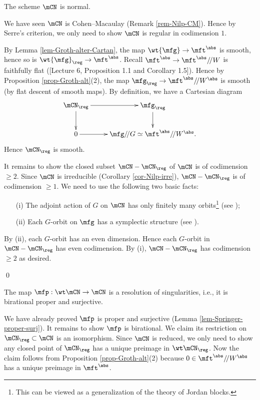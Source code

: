 	
	\begin{prop}
		The scheme $\mCN$ is normal.
	\end{prop}

	\proof[Sketch]
		We have seen $\mCN$ is Cohen--Macaulay (Remark \ref{rem-Nilp-CM}). Hence by Serre's criterion, we only need to show $\mCN$ is regular in codimension $1$. 

		By Lemma \ref{lem-Groth-alter-Cartan}, the map $\wt{\mfg} \to \mft^\abs$ is smooth, hence so is $\wt{\mfg}_\reg \to \mft^\abs$. Recall $\mft^\abs\to \mft^\abs/\!/W$ is faithfully flat ([Lecture 6, Proposition 1.1 and Corollary 1.5]). Hence by Proposition \ref{prop-Groth-alt}(2), the map $\mfg_\reg \to \mft^\abs/\!/W^\abs$ is smooth (by flat descent of smooth maps). By definition, we have a Cartesian diagram
		\[
			\xymatrix{
				\mCN_\reg \ar[r] \ar[d] & \mfg_\reg \ar[d] \\
				0 \ar[r] & \mfg/\!/G \simeq \mft^\abs/\!/W^\abs.
			}
		\]
		Hence $\mCN_\reg$ is smooth.

		It remains to show the closed subset $\mCN-\mCN_\reg$ of $\mCN$ is of codimension $\ge 2$. Since $\mCN$ is irreducible (Corollary \ref{cor-Nilp-irre}), $\mCN-\mCN_\reg$ is of codimension $\ge 1$. We need to use the following two basic facts:
		\begin{itemize}
			\item[(i)]
				The adjoint action of $G$ on $\mCN$ has only finitely many orbits\footnote{This can be viewed as a generalization of the theory of Jordan blocks.} (see \cite[Proposition 3.2.9]{CG});
			\item[(ii)]
				Each $G$-orbit on $\mfg$ has a symplectic structure (see \cite[Proposition 1.1.5]{CG}).
		\end{itemize}
		By (ii), each $G$-orbit has an even dimension. Hence each $G$-orbit in $\mCN-\mCN_\reg$ has even codimension. By (i), $\mCN-\mCN_\reg$ has codimension $\ge 2$ as desired.

	\qed

	\begin{cor}
		The map $\mfp:\wt\mCN \to \mCN$ is a resolution of singularities, i.e., it is birational proper and surjective.
	\end{cor}

	\proof
		We have already proved $\mfp$ is proper and surjective (Lemma \ref{lem-Springer-proper-surj}). It remains to show $\mfp$ is birational. We claim its restriction on $\mCN_\reg\subset \mCN$ is an isomorphism. Since $\mCN$ is reduced, we only need to show any closed point of $\mCN_\reg$ has a unique preimage in $\wt\mCN_\reg$. Now the claim follows from Proposition \ref{prop-Groth-alt}(2) because $0\in \mft^\abs/\!/W^\abs$ has a unique preimage in $\mft^\abs$.


